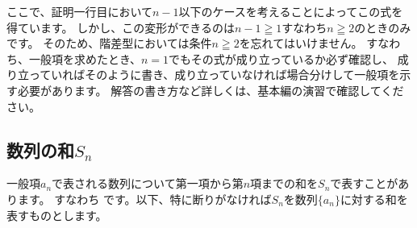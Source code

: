 \documentclass[a4paper]{ltjsarticle}
\begin{document}
ここで、証明一行目において$n-1$以下のケースを考えることによってこの式を得ています。
しかし、この変形ができるのは$n-1\geqq 1$すなわち$n\geqq 2$のときのみです。
そのため、階差型においては条件$n\geqq 2$を忘れてはいけません。
すなわち、一般項を求めたとき、$n=1$でもその式が成り立っているか必ず確認し、
成り立っていればそのように書き、成り立っていなければ場合分けして一般項を示す必要があります。
解答の書き方など詳しくは、基本編の演習で確認してください。


\subsection{数列の和$S_n$}
一般項$a_n$で表される数列について第一項から第$n$項までの和を$S_n$で表すことがあります。
すなわち
です。以下、特に断りがなければ$S_n$を数列$\{a_n\}$に対する和を表すものとします。

\newpage
\end{document}
